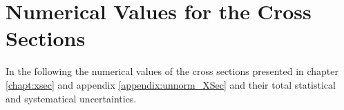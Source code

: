 \chapter{Numerical Values for the Cross Sections}\label{appendix:xsec_table}

In the following the numerical values of the cross sections presented in chapter \ref{chapt:xsec} and 
appendix \ref{appendix:unnorm_XSec} and their total statistical and systematical uncertainties.


% 


% 

% 


% 


% 


% 


% 


% 


